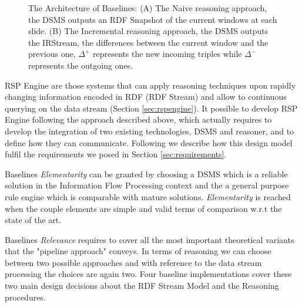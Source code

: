 \begin{figure}[tbh]
 \centering
{}
	\caption[\name Baselines Architecture]{The Architecture of \name Baselines: (A) The Naive reasoning approach, the DSMS outputs an RDF Snapshot of the current windows at each slide. (B) The Incremental reasoning approach, the DSMS outputs the IRStream, the differences between the current window and the previous one, $\Delta^{+}$ represents the new incoming triples while $\Delta^{-}$ represents the outgoing ones.}
	\label{fig:baselines}
\end{figure}

\noindent RSP Engine are those systems that can apply reasoning techniques upon rapidly changing information encoded in RDF (RDF Stream) and allow to continuous querying on the data stream (Section \ref{sec:rspengine}). It possible to develop RSP Engine following the approach described above, which actually requires to develop the integration of two existing technologies, DSMS and reasoner, and to define how they can communicate. Following we describe how this design model fulfil the requirements we posed in Section \ref{sec:requirements}.

Baselines \textit{Elementarity} can be granted by choosing a DSMS which is a reliable solution in the Information Flow Processing context and the a general purpose rule engine which is comparable with mature solutions. \textit{Elementarity} is reached when the couple elements are simple and valid terms of comparison w.r.t the state of the art.

Baselines \textit{Relevance} requires to cover all the most important theoretical variants that the "pipeline approach" conveys. In terms of reasoning we can choose between two possible approaches and with reference to the data stream processing the choices are again two. Four baseline implementations cover these two main design decisions about the RDF Stream Model and the Reasoning procedures. 

